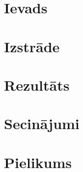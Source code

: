 \documentclass[12pt,a4paper,oneside]{article}
\begin{document}



\clearpage
\tableofcontents
\clearpage

\newpage
\section{Ievads}


\newpage
\section{Izstrāde}


\newpage
\section{Rezultāts}


\newpage
\section{Secinājumi}


\newpage
\section{Pielikums}


\newpage
\printbibliography
\end{document}
